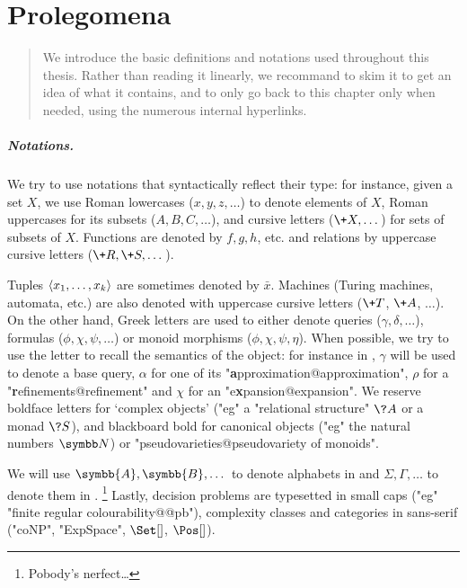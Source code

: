 \chapter{Prolegomena}
\label{ch:general-preliminaries}

\begin{chapterpresentation}
	\begin{abstract}
		We introduce the basic definitions and notations used throughout this thesis.
		Rather than reading it linearly, we recommand to skim it
		to get an idea of what it contains, and to only go back to this chapter
		only when needed, using the numerous internal hyperlinks.
	\end{abstract}
		
	\par\bigskip\bigskip
	\chaptertoc
\end{chapterpresentation}

\paragraph*{Notations.}
We try to use notations that syntactically reflect their type:
for instance, given a set $X$, we use Roman lowercases ($x,y,z,\dotsc$)
to denote elements of $X$, Roman uppercases for its subsets ($A, B, C, \dotsc$),
and cursive letters ($\+X, \dotsc$) for sets of subsets of $X$.
Functions are denoted by $f, g, h$, etc. and relations by
uppercase cursive letters ($\+R, \+S, \dotsc$).

Tuples $\langle x_1,\dotsc,x_k\rangle$ are sometimes denoted by $\bar x$.
Machines (Turing machines, automata, etc.) are also denoted
with uppercase cursive letters ($\+T$, $\+A$, $\dotsc$).
On the other hand, Greek letters are used to either denote queries ($\gamma, \delta, \dotsc$),
formulas ($\phi, \chi, \psi, \dotsc$) or monoid morphisms ($\phi, \chi, \psi, \eta$). When possible, we try to
use the letter to recall the semantics of the object: for instance in
, $\gamma$ will be used to denote a base query,
$\alpha$ for one of its "\textbf{a}pproximation@approximation",
$\rho$ for a "\textbf{r}efinements@refinement" and
$\chi$ for an "e\textbf{x}pansion@expansion".
We reserve boldface letters for `complex objects' ("eg"
a "relational structure" $\?A$ or a monad $\?S$), and blackboard bold
for canonical objects ("eg" the natural numbers $\N$) or "pseudovarieties@pseudovariety of monoids".

We will use $\symbb{A}, \symbb{B}, \dotsc$ to denote
alphabets in  and $\Sigma, \Gamma, \dotsc$
to denote them in .%
\footnote{Pobody's nerfect…}
Lastly, decision problems are typesetted in small caps
("eg" "finite regular colourability@@pb"), 
complexity classes and categories in sans-serif ("coNP", "ExpSpace", $\Set[]$,
$\Pos[]$).


